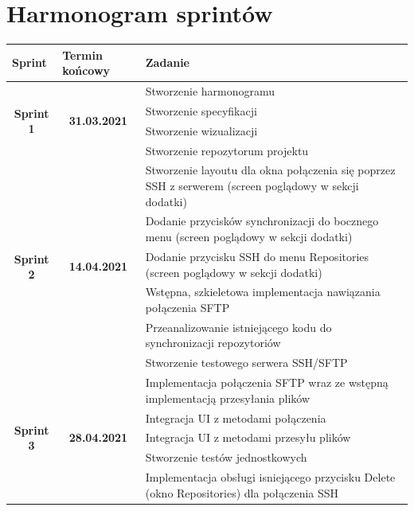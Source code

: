 \documentclass[12pt]{article}
\begin{document}
\section{Harmonogram sprintów}
\begin{center}
\begin{longtable}{|c|c|p{8.5cm}|}
\hline
\multicolumn{1}{|l|}{Sprint} & \multicolumn{1}{l|}{Termin końcowy} & Zadanie \\ \hline
\endfirsthead
%
\endhead
%
\multirow{4}{*}{\textbf{Sprint 1}} & \multirow{4}{*}{\textbf{31.03.2021}} & Stworzenie harmonogramu \\ \cline{3-3} 
 &  & Stworzenie specyfikacji \\ \cline{3-3} 
 &  & Stworzenie wizualizacji \\ \cline{3-3} 
 &  & Stworzenie repozytorum projektu \\ \hline
\multirow{6}{*}{\textbf{Sprint 2}} & \multirow{6}{*}{\textbf{14.04.2021}} & Stworzenie layoutu dla okna połączenia się poprzez SSH z serwerem (screen poglądowy w sekcji dodatki) \\ \cline{3-3} 
 &  & Dodanie przycisków synchronizacji do bocznego menu (screen poglądowy w sekcji dodatki) \\ \cline{3-3} 
 &  & Dodanie przycisku SSH do menu Repositories (screen poglądowy w sekcji dodatki) \\ \cline{3-3} 
 &  & Wstępna, szkieletowa implementacja nawiązania połączenia SFTP \\ \cline{3-3} 
 &  & Przeanalizowanie istniejącego kodu do synchronizacji repozytoriów \\ \cline{3-3} 
 &  & Stworzenie testowego serwera SSH/SFTP \\ \hline
\multirow{5}{*}{\textbf{Sprint 3}} & \multirow{5}{*}{\textbf{28.04.2021}} & Implementacja połączenia SFTP wraz ze wstępną implementacją przesyłania plików \\ \cline{3-3} 
 &  & Integracja UI z metodami połączenia \\ \cline{3-3} 
 &  & Integracja UI z metodami przesyłu plików \\ \cline{3-3} 
 &  & Stworzenie testów jednostkowych \\ \cline{3-3} 
 &  & Implementacja obsługi isniejącego przycisku Delete (okno Repositories) dla połączenia SSH \\ \hline

\end{longtable}
\end{center}
\end{document}
